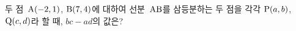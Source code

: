 두 점~$\mathrm{A}(-2{,}\mkern3mu\mathopen{}1)$, $\mathrm{B}(7{,}\mkern3mu\mathopen{}4)$에 대하여 선분~$\mathrm{AB}$를 삼등분하는 두 점을 각각 $\mathrm{P}(a{,}\mkern3mu\mathopen{}b)$, $\mathrm{Q}(c{,}\mkern3mu\mathopen{}d)$라 할 때, $bc-ad$의 값은? 
